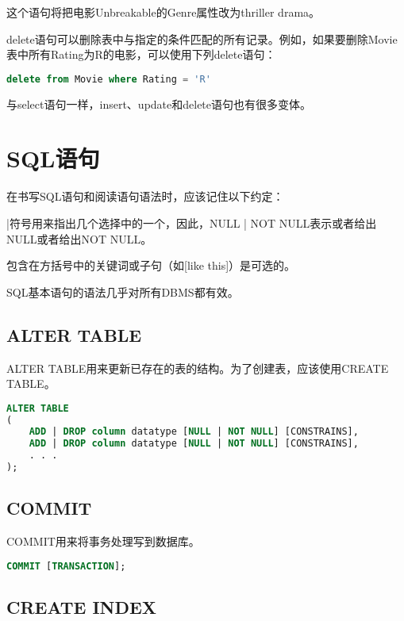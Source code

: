 	这个语句将把电影Unbreakable的Genre属性改为thriller drama。
	
	delete语句可以删除表中与指定的条件匹配的所有记录。例如，如果要删除Movie表中所有Rating为R的电影，可以使用下列delete语句：
	
\begin{lstlisting}[language=SQL]
delete from Movie where Rating = 'R'
\end{lstlisting}

	
	与select语句一样，insert、update和delete语句也有很多变体。
\chapter{SQL语句}

在书写SQL语句和阅读语句语法时，应该记住以下约定：

\begin{compactitem}
\item |符号用来指出几个选择中的一个，因此，NULL | NOT NULL表示或者给出NULL或者给出NOT NULL。
\item 包含在方括号中的关键词或子句（如[like this]）是可选的。
\item SQL基本语句的语法几乎对所有DBMS都有效。
\end{compactitem}

\section{ALTER TABLE}

ALTER TABLE用来更新已存在的表的结构。为了创建表，应该使用CREATE TABLE。

\begin{lstlisting}[language=SQL]
ALTER TABLE
(
	ADD | DROP column datatype [NULL | NOT NULL] [CONSTRAINS],
	ADD | DROP column datatype [NULL | NOT NULL] [CONSTRAINS],
	. . .
);
\end{lstlisting}


\section{COMMIT}

COMMIT用来将事务处理写到数据库。

\begin{lstlisting}[language=SQL]
COMMIT [TRANSACTION];
\end{lstlisting}

\section{CREATE INDEX}


